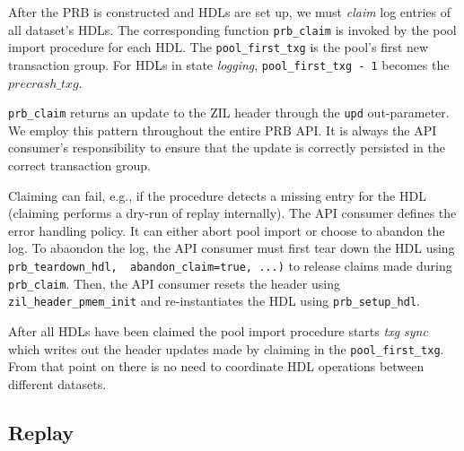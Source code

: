 \documentclass[12pt,a4paper,twoside]{book}
\begin{document}
After the PRB is constructed and HDLs are set up, we must \textit{claim} log entries of all dataset's HDLs.
The corresponding function \lstinline{prb_claim} is invoked by the pool import procedure for each HDL.
The \lstinline{pool_first_txg} is the pool's first new transaction group.
For HDLs in state \textit{logging}, \lstinline{pool_first_txg - 1} becomes the $precrash\_txg$.

\lstinline{prb_claim} returns an update to the ZIL header through the \lstinline{upd} out-parameter.
We employ this pattern throughout the entire PRB API.
It is always the API consumer's responsibility to ensure that the update is correctly persisted in the correct transaction group.

Claiming can fail, e.g., if the procedure detects a missing entry for the HDL (claiming performs a dry-run of replay internally).
The API consumer defines the error handling policy.
It can either abort pool import or choose to abandon the log.
To abaondon the log, the API consumer must first tear down the HDL using \lstinline{prb_teardown_hdl,  abandon_claim=true, ...)} to release claims made during \lstinline{prb_claim}.
Then, the API consumer resets the header using \lstinline{zil_header_pmem_init} and re-instantiates the HDL using \lstinline{prb_setup_hdl}.

After all HDLs have been claimed the pool import procedure starts \textit{txg sync} which writes out the header updates made by claiming in the \lstinline{pool_first_txg}.
From that point on there is no need to coordinate HDL operations between different datasets.


\subsection{Replay}\label{di:prb:api:replay}
\end{document}
